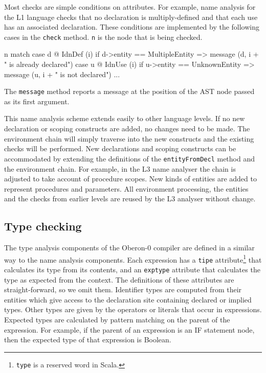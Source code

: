 Most checks are simple conditions on attributes.
For example, name analysis for the L1 language checks that no declaration is multiply-defined and that each use has an associated declaration.
These conditions are implemented by the following cases in the \verb|check| method. 
\verb|n| is the node that is being checked.

\begin{scala}
  n match {
    case d @ IdnDef (i) if d->entity == MultipleEntity =>
      message (d, i + " is already declared")
    case u @ IdnUse (i) if u->entity == UnknownEntity =>
      message (u, i + " is not declared")
    ...
  }
\end{scala}

\noindent
The \verb|message| method reports a message at the position of the AST node passed as its first argument.

This name analysis scheme extends easily to other language levels.
If no new declaration or scoping constructs are added, no changes need to be made.
The environment chain will simply traverse into the new constructs and the existing checks will be performed.
New declarations and scoping constructs can be accommodated by extending the definitions of the \verb|entityFromDecl| method and the environment chain.
For example, in the L3 name analyser the chain is adjusted to take account of procedure scopes.
New kinds of entities are added to represent procedures and parameters.
All environment processing, the entities and the checks from earlier levels are reused by the L3 analyser without change.

\subsection{Type checking}

The type analysis components of the Oberon-0 compiler are defined in a similar way to the name analysis components.
Each expression has a \verb|tipe| attribute\footnote{\texttt{type} is a reserved word in Scala.} that calculates its type from its contents, and an \verb|exptype| attribute that calculates the type as expected from the context.
The definitions of these attributes are straight-forward, so we omit them.
Identifier types are computed from their entities which give access to the declaration site containing declared or implied types.
Other types are given by the operators or literals that occur in expressions.
Expected types are calculated by pattern matching on the parent of the expression.
For example, if the parent of an expression is an IF statement node, then the expected type of that expression is Boolean.

